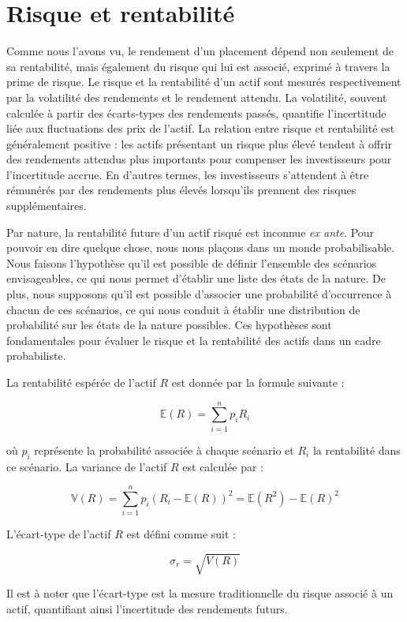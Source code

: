 \documentclass[a4paper, 12pt]{report}
\begin{document}
\section{Risque et rentabilité}

Comme nous l'avons vu, le rendement d'un placement dépend non seulement de sa rentabilité, mais également du risque qui lui est associé, exprimé à travers la prime de risque. Le risque et la rentabilité d'un actif sont mesurés respectivement par la volatilité des rendements et le rendement attendu. La volatilité, souvent calculée à partir des écarts-types des rendements passés, quantifie l'incertitude liée aux fluctuations des prix de l'actif. La relation entre risque et rentabilité est généralement positive : les actifs présentant un risque plus élevé tendent à offrir des rendements attendus plus importants pour compenser les investisseurs pour l'incertitude accrue. En d'autres termes, les investisseurs s'attendent à être rémunérés par des rendements plus élevés lorsqu'ils prennent des risques supplémentaires.

Par nature, la rentabilité future d'un actif risqué est inconnue \textit{ex ante}. Pour pouvoir en dire quelque chose, nous nous plaçons dans un monde probabilisable. Nous faisons l'hypothèse qu'il est possible de définir l'ensemble des scénarios envisageables, ce qui nous permet d'établir une liste des états de la nature. De plus, nous supposons qu'il est possible d'associer une probabilité d'occurrence à chacun de ces scénarios, ce qui nous conduit à établir une distribution de probabilité sur les états de la nature possibles. Ces hypothèses sont fondamentales pour évaluer le risque et la rentabilité des actifs dans un cadre probabiliste.

La rentabilité espérée de l'actif \( R \) est donnée par la formule suivante :

\[
\mathbb{E}(R) = \sum_{i=1}^{n} p_i R_i
\]

où \( p_i \) représente la probabilité associée à chaque scénario et \( R_i \) la rentabilité dans ce scénario. La variance de l'actif \( R \) est calculée par :

\[
\mathbb{V}(R) = \sum_{i=1}^{n} p_i (R_i - \mathbb{E}(R))^2 = \mathbb{E}(R^2) - \mathbb{E}(R)^2
\]

L'écart-type de l'actif \( R \) est défini comme suit :

\[
\sigma_r = \sqrt{V(R)}
\]

Il est à noter que l'écart-type est la mesure traditionnelle du risque associé à un actif, quantifiant ainsi l'incertitude des rendements futurs.
\end{document}
